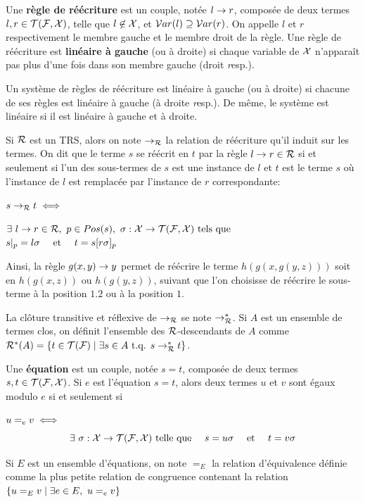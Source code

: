 \begin{definition}
  Une \textbf{règle de réécriture} est un couple, notée $l \rightarrow r$, composée de deux termes $l, r \in \mathcal{T(F, X)}$,
  telle que $l \not \in \mathcal X$, et $\mathcal{ V}ar(l) \supseteq \mathcal{ V}ar(r)$. 
  On appelle $l$ et $r$ respectivement le membre gauche et le membre droit de la règle.
  Une règle de réécriture est \textbf{linéaire à gauche} (ou à droite) si chaque variable de $\mathcal X$ 
  n'apparaît pas plus d'une fois dans son membre gauche (droit {\textit resp.}).
\end{definition}

Un système de règles de réécriture est linéaire à gauche (ou à droite) si chacune 
de ses règles est linéaire à gauche (à droite {\textit resp.}). De même, le système est 
linéaire si il est linéaire à gauche et à droite.

\begin{definition}
  Si $\mathcal R$ est un TRS, alors on note $\rightarrow_{\mathcal R}$ la relation de réécriture qu'il induit sur les termes.
  On dit que le terme $s$ se réécrit en $t$ par la règle $l \rightarrow r \in \mathcal R$ si et seulement si l'un des sous-termes de $s$
  est une instance de $l$ et $t$ est le terme $s$ où l'instance de $l$ est remplacée par l'instance de $r$ correspondante:

  \noindent $s \rightarrow_\mathcal R t \; \Longleftrightarrow \;$
  \begin{flushright}
    $\exists\ l \rw r \in \R,\ p \in Pos(s),\ \sigma: \X \rw \TFX \textrm{ tels que }\quad \quad \quad$
    $s|_p = l\sigma \quad \mbox{ et } \quad  t = s[r\sigma]_p$
  \end{flushright}
\end{definition}
Ainsi, la règle $g(x, y) \rightarrow y$ permet de réécrire le terme $h(g(x, g(y, z)))$ 
soit en $h(g(x, z))$ ou $h(g(y, z))$, suivant que l'on choisisse de réécrire le sous-terme
à la position $1.2$ ou à la position $1$.

La clôture transitive et réflexive de $\rightarrow_\mathcal R$ se note $\rightarrow^*_{\mathcal R}$.
Si $A$ est un ensemble de termes clos, on définit l'ensemble des $\mathcal R$-descendants 
de $A$ comme $\mathcal R^*(A) = \{t \in \mathcal{T(F)} \; | \; \exists s \in A \mbox{ t.q. } s \rightarrow^*_{\mathcal R} t \}$.

\begin{definition}
  Une \textbf{équation} est un couple, notée $s = t$, composée de deux termes $s, t \in \mathcal{T(F, X)}$.
  Si $e$ est l'équation $s = t$, alors deux termes $u$ et $v$ sont égaux modulo $e$ si et seulement si
  
  \noindent $u =_e v \; \Longleftrightarrow \;$\\
  \[\exists\ \sigma: \mathcal X \rightarrow \mathcal{T(F, X)} \textrm{ telle que } \quad s = u\sigma \quad \mbox{ et } \quad  t = v\sigma\]
  
  Si $E$ est un ensemble d'équations, on note $=_E$ la relation d'équivalence définie comme la plus petite relation
  de congruence contenant la relation $\{ u =_E v \; | \; \exists e \in E,\ u =_e v\}$
\end{definition}



